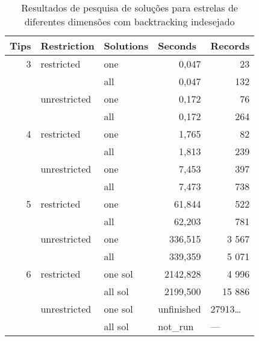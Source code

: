 \begin{table}[ht]
  \centering
  \caption{Resultados de pesquisa de soluções para estrelas de diferentes dimensões com backtracking indesejado}
    \begin{tabular}{rrlll}
    \hline
    \multicolumn{1}{l}{Tips} & \multicolumn{1}{l}{Restriction} & Solutions & Seconds & Records \\ \hline\hline
    3     & \multicolumn{1}{l}{restricted} & one   & \multicolumn{1}{r}{0,047} & \multicolumn{1}{r}{23} \\
          &       & all   & \multicolumn{1}{r}{0,047} & \multicolumn{1}{r}{132} \\
          & \multicolumn{1}{l}{unrestricted} & one   & \multicolumn{1}{r}{0,172} & \multicolumn{1}{r}{76} \\
          &       & all   & \multicolumn{1}{r}{0,172} & \multicolumn{1}{r}{264} \\
    4     & \multicolumn{1}{l}{restricted} & one   & \multicolumn{1}{r}{1,765} & \multicolumn{1}{r}{82} \\
          &       & all   & \multicolumn{1}{r}{1,813} & \multicolumn{1}{r}{239} \\
          & \multicolumn{1}{l}{unrestricted} & one   & \multicolumn{1}{r}{7,453} & \multicolumn{1}{r}{397} \\
          &       & all   & \multicolumn{1}{r}{7,473} & \multicolumn{1}{r}{738} \\
    5     & \multicolumn{1}{l}{restricted} & one   & \multicolumn{1}{r}{61,844} & \multicolumn{1}{r}{522} \\
          &       & all   & \multicolumn{1}{r}{62,203} & \multicolumn{1}{r}{781} \\
          & \multicolumn{1}{l}{unrestricted} & one   & \multicolumn{1}{r}{336,515} & \multicolumn{1}{r}{3 567} \\
          &       & all   & \multicolumn{1}{r}{339,359} & \multicolumn{1}{r}{5 071} \\
    6     & \multicolumn{1}{l}{restricted} & one sol & \multicolumn{1}{r}{2142,828} & \multicolumn{1}{r}{4 996} \\
          &       & all sol & \multicolumn{1}{r}{2199,500} & \multicolumn{1}{r}{15 886} \\
          & \multicolumn{1}{l}{unrestricted} & one sol & unfinished & 27913… \\
          &       & all sol & not\_run & --- \\ \hline
    \end{tabular}%
  \label{tab:unwanted_bt}%
\end{table}%